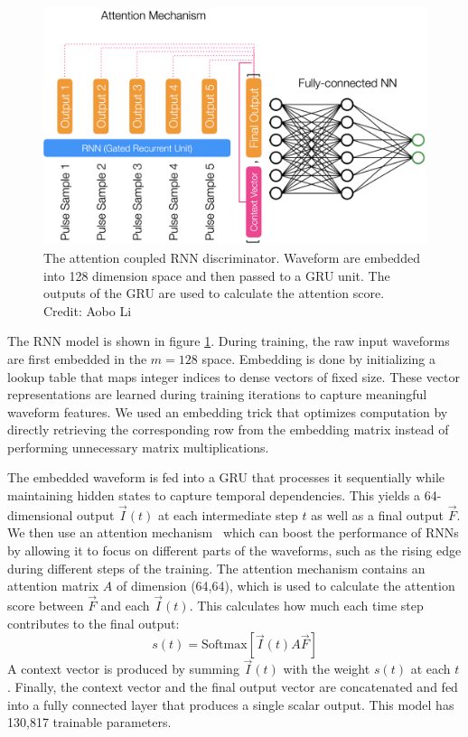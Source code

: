 \begin{figure}[htb!]
    \centering
    \includegraphics[width=0.7\linewidth,trim={0pc 0pc 0pc 0pc},clip]{ch6/figs/rnnAttention.png}
    \caption{The attention coupled RNN discriminator. Waveform are embedded into 128 dimension space and then passed to a GRU unit. The outputs of the GRU are used to calculate the attention score. Credit: Aobo Li}
    \label{ch6_fig_detail_network}
\end{figure}

The RNN model is shown in figure \ref{ch6_fig_detail_network}. During training, the raw input waveforms are first embedded in the $m=128$ space. Embedding is done by initializing a lookup table that maps integer indices to dense vectors of fixed size. These vector representations are learned during training iterations to capture meaningful waveform features. We used an embedding trick that optimizes computation by directly retrieving the corresponding row from the embedding matrix instead of performing unnecessary matrix multiplications. 

The embedded waveform is fed into a GRU that processes it sequentially while maintaining hidden states to capture temporal dependencies. This yields a 64-dimensional output $\vec{I}(t)$ at each intermediate step $t$ as well as a final output $\vec{F}$. We then use an attention mechanism~\cite{attention} which can boost the performance of RNNs by allowing it to focus on different parts of the waveforms, such as the rising edge during different steps of the training. The attention mechanism contains an attention matrix \( A \) of dimension (64,64), which is used to calculate the attention score between $\vec{F}$ and each $\vec{I}(t)$. This calculates how much each time step contributes to the final output:
\begin{equation}
    s(t) = \mathrm{Softmax}[\vec{I}(t) A \vec{F}]
\end{equation}
A context vector is produced by summing $\vec{I}(t)$ with the weight $s(t)$ at each $t$. Finally, the context vector and the final output vector are concatenated and fed into a fully connected layer that produces a single scalar output. This model has 130,817 trainable parameters.